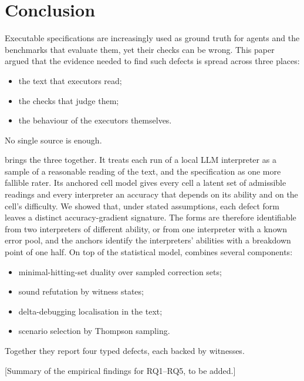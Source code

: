 \section{Conclusion}
\label{sec:conclusion}

Executable specifications are increasingly used as ground truth for agents and the benchmarks that evaluate them, yet their checks can be wrong. This paper argued that the evidence needed to find such defects is spread across three places:
\begin{itemize}[leftmargin=*]
\item the text that executors read;
\item the checks that judge them;
\item the behaviour of the executors themselves.
\end{itemize}
No single source is enough.

\specdx brings the three together. It treats each run of a local LLM interpreter as a sample of a reasonable reading of the text, and the specification as one more fallible rater. Its anchored cell model gives every cell a latent set of admissible readings and every interpreter an accuracy that depends on its ability and on the cell's difficulty. We showed that, under stated assumptions, each defect form leaves a distinct accuracy-gradient signature. The forms are therefore identifiable from two interpreters of different ability, or from one interpreter with a known error pool, and the anchors identify the interpreters' abilities with a breakdown point of one half. On top of the statistical model, \specdx combines several components:
\begin{itemize}[leftmargin=*]
\item minimal-hitting-set duality over sampled correction sets;
\item sound refutation by witness states;
\item delta-debugging localisation in the text;
\item scenario selection by Thompson sampling.
\end{itemize}
Together they report four typed defects, each backed by witnesses.

[Summary of the empirical findings for RQ1--RQ5, to be added.]

